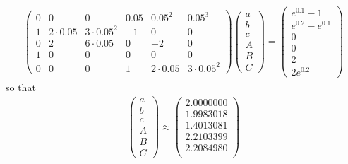 \documentclass{homework}
\begin{document}
{\begin{enumerate}[label={(\alph*)},topsep=0pt]
\begin{align*}
\begin{pmatrix}
                      0    & 0           & 0             & 0.05 & 0.05^2      & 0.05^3        \\
                      1    & 2\cdot 0.05 & 3\cdot 0.05^2 & -1   & 0           & 0             \\
                      0    & 2           & 6\cdot 0.05   & 0    & -2          & 0             \\
                      1    & 0           & 0             & 0    & 0           & 0             \\
                      0    & 0           & 0             & 1    & 2\cdot 0.05 & 3\cdot 0.05^2
                  \end{pmatrix}\begin{pmatrix}
                      a \\b\\c\\A\\B\\C
                  \end{pmatrix}=\begin{pmatrix}
                      e^{0.1}-1       \\
                      e^{0.2}-e^{0.1} \\
                      0               \\
                      0               \\
                      2               \\
                      2e^{0.2}
                  \end{pmatrix}
              \end{align*}
              so that
              \begin{align*}
                  \begin{pmatrix}
                      a \\b\\c\\A\\B\\C
                  \end{pmatrix}\approx\begin{pmatrix}
                      2.0000000 \\
                      1.9983018 \\
                      1.4013081 \\
                      2.2103399 \\
                      2.2084980 \\

\end{pmatrix}
\end{align*}
\end{enumerate}}
\end{document}
